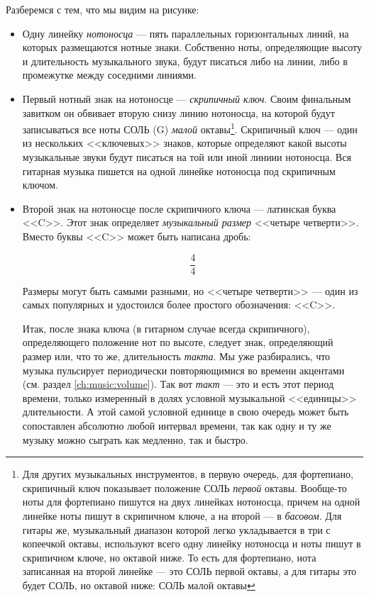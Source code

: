 Разберемся с тем, что мы видим на рисунке:
\begin{itemize}
    \item Одну линейку \emph{нотоносца} --- пять параллельных горизонтальных линий, на которых размещаются нотные знаки. Собственно ноты, определяющие высоту и длительность музыкального звука, будут писаться либо на линии, либо в промежутке между соседними линиями.
    
    \item Первый нотный знак на нотоносце --- \emph{скрипичный ключ}. Своим финальным завитком он обвивает вторую снизу линию нотоносца, на которой будут записываться все ноты СОЛЬ (G) \emph{малой} октавы\footnote{Для других музыкальных инструментов, в первую очередь, для фортепиано, скрипичный ключ показывает положение СОЛЬ \emph{первой} октавы. Вообще-то ноты для фортепиано пишутся на двух линейках нотоносца, причем на одной линейке ноты пишут в скрипичном ключе, а на второй --- в \emph{басовом}. Для гитары же, музыкальный диапазон которой легко укладывается в три с копеечкой октавы, используют всего одну линейку нотоносца и ноты пишут в скрипичном ключе, но октавой ниже. То есть для фортепиано, нота записанная на второй линейке --- это СОЛЬ первой октавы, а для гитары это будет СОЛЬ, но октавой ниже: СОЛЬ малой октавы}. Скрипичный ключ --- один из нескольких <<ключевых>> знаков, которые определяют какой высоты музыкальные звуки будут писаться на той или иной линиии нотоносца. Вся гитарная музыка пишется на одной линейке нотоносца под скрипичным ключом.
    
    \item Второй знак на нотоносце после скрипичного ключа --- латинская буква <<C>>. Этот знак определяет \emph{музыкальный размер} <<четыре четверти>>. Вместо буквы <<C>> может быть написана дробь:
    
    \[\frac{4}{4}\]
        
    Размеры могут быть самыми разными, но <<четыре четверти>> --- один из самых популярных и удостоился более простого обозначения: <<C>>.
    
    Итак, после знака ключа (в гитарном случае всегда скрипичного), определяющего положение нот по высоте, следует знак, определяющий размер или, что то же, длительность \emph{такта}. Мы уже разбирались, что музыка пульсирует периодически повторяющимися во времени акцентами (см. раздел \ref{ch:music:volume}). Так вот \emph{такт} --- это и есть этот период времени, только измеренный в долях условной музыкальной <<единицы>> длительности. А этой самой условной единице в свою очередь может быть сопоставлен абсолютно любой интервал времени, так как одну и ту же музыку можно сыграть как медленно, так и быстро. 
    

\end{itemize}
